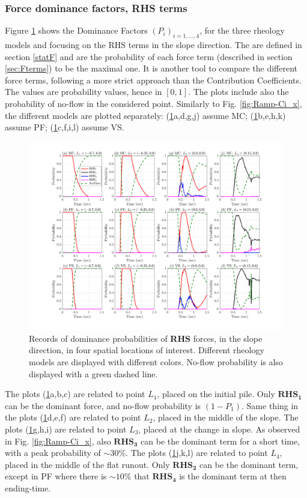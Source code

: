 \documentclass{article}
\begin{document}
\subsubsection{Force dominance factors, RHS terms}\label{stat1}
Figure \ref{fig:Ramp-Pr_x} shows the Dominance Factors $(P_i)_{i=1,\dots,4}$, for the three rheology models and focusing on the RHS terms in the slope direction. The are defined in section \ref{statF} and are the probability of each force term (described in section \ref{sec:Fterms}) to be the maximal one. It is another tool to compare the different force terms, following a more strict approach than the Contribution Coefficients. The values are probability values, hence in $[0,1]$. The plots include also the probability of no-flow in the considered point. Similarly to Fig. \ref{fig:Ramp-Ci_x}, the different models are plotted separately: (\ref{fig:Ramp-Pr_x}a,d,g,j) assume MC; (\ref{fig:Ramp-Pr_x}b,e,h,k) assume PF; (\ref{fig:Ramp-Pr_x}c,f,i,l) assume VS.
\begin{figure}[H]
         \centering
        \includegraphics[width=1\textwidth]{InclinedPlane/ForceContrib/Pr_x.png}
        \caption{Records of dominance probabilities of \textbf{RHS} forces, in the slope direction, in four spatial locations of interest. Different rheology models are displayed with different colors. No-flow probability is also displayed with a green dashed line.}
        \label{fig:Ramp-Pr_x}
\end{figure}
The plots (\ref{fig:Ramp-Pr_x}a,b,c) are related to point $L_1$, placed on the initial pile. Only $\boldsymbol{RHS_1}$ can be the dominant force, and no-flow probability is $(1-P_1)$. Same thing in the plots (\ref{fig:Ramp-Pr_x}d,e,f) are related to point $L_2$, placed in the middle of the slope. The plots (\ref{fig:Ramp-Pr_x}g,h,i) are related to point $L_3$, placed at the change in slope. As observed in Fig. \ref{fig:Ramp-Ci_x}, also $\boldsymbol{RHS_3}$ can be the dominant term for a short time, with a peak probability of $\sim 30\%$. The plots (\ref{fig:Ramp-Pr_x}j,k,l) are related to point $L_4$, placed in the middle of the flat runout. Only $\boldsymbol{RHS_2}$ can be the dominant term, except in PF where there is $\sim 10\%$ that $\boldsymbol{RHS_4}$ is the dominant term at then ending-time.
\end{document}
